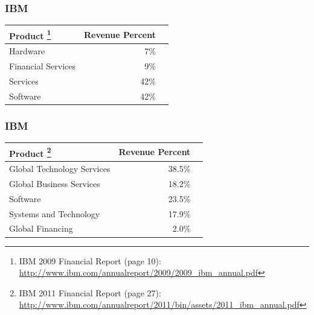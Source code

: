 \documentclass[18pt]{beamer}
\begin{document}
{
\begin{frame}
\frametitle{IBM}
\begin{center}
\begin{tabular}{lrr}
\hline
\textbf{Product}
\footnote{IBM 2009 Financial Report (page 10):
\url{http://www.ibm.com/annualreport/2009/2009_ibm_annual.pdf}}
& \textbf{Revenue Percent} \\
\hline
\hline
Hardware & 7\% \\
Financial Services & 9\% \\
Services & 42\% \\
Software & 42\%\\
\hline
\end{tabular}
\end{center}
\end{frame}
}

{
\begin{frame}
\frametitle{IBM}
\begin{center}
\begin{tabular}{lrr}
\hline
\textbf{Product}
\footnote{IBM 2011 Financial Report (page 27):
\url{http://www.ibm.com/annualreport/2011/bin/assets/2011_ibm_annual.pdf}}
& \textbf{Revenue Percent} \\
\hline
\hline
Global Technology Services & 38.5\% \\
Global Business Services & 18.2\% \\
Software & 23.5\%\\
Systems and Technology & 17.9\% \\
Global Financing & 2.0\% \\
\hline
\end{tabular}
\end{center}
\end{frame}
}
\end{document}
